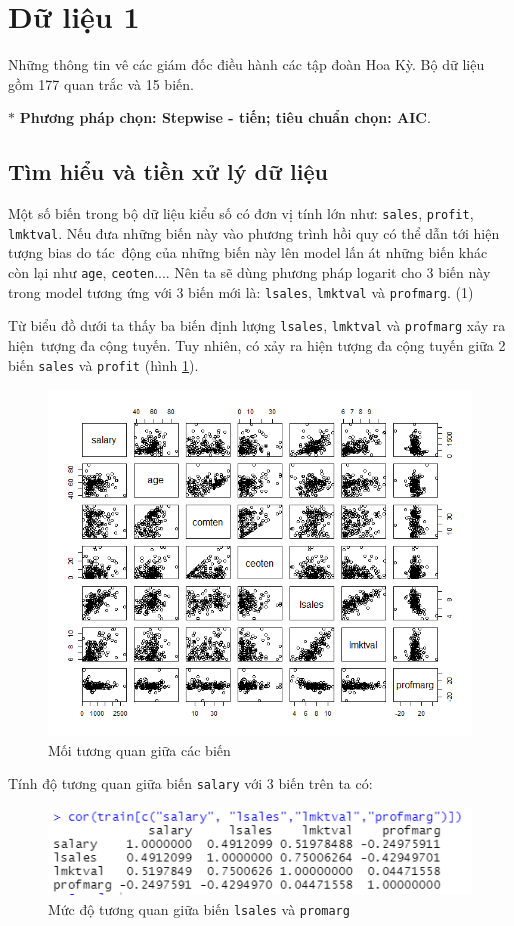 \section{Dữ liệu 1}
Những thông tin vê các giám đốc điều hành các tập đoàn Hoa Kỳ. Bộ dữ liệu gồm 177 quan trắc và 15 biến.

$*$ \textbf{Phương pháp chọn: Stepwise - tiến; tiêu chuẩn chọn: AIC}.

\subsection*{Tìm hiểu và tiền xử lý dữ liệu}

Một số biến trong bộ dữ liệu kiểu số có đơn vị tính lớn như: \texttt{sales}, \texttt{profit}, \texttt{lmktval}. Nếu đưa những biến này vào phương trình hồi quy có thể dẫn tới hiện tượng bias do tác~động của những biến này lên model lấn át những biến khác còn lại như \texttt{age}, \texttt{ceoten}.... Nên ta sẽ dùng phương pháp logarit cho 3 biến này trong model tương ứng với 3 biến mới là:  \texttt{lsales}, \texttt{lmktval} và \texttt{profmarg}. (1)

Từ biểu đồ dưới ta thấy ba biến định lượng \texttt{lsales}, \texttt{lmktval} và \texttt{profmarg} xảy ra hiện~tượng đa cộng tuyến. Tuy nhiên, có xảy ra hiện tượng đa cộng tuyến giữa 2 biến \texttt{sales} và \texttt{profit} (hình \ref{fig-b1:plot-vars}).

\begin{figure}[H]
	\centering
	\includegraphics[width=.75\linewidth]{../Photo Of Result/B1_plotVriables.png}  
	\caption{Mối tương quan giữa các biến}
	\label{fig-b1:plot-vars}
\end{figure}
Tính độ tương quan giữa biến \texttt{salary} với 3 biến trên ta có:
\begin{figure}[H]
	\centering
	\includegraphics[width=.7\linewidth]{../Photo Of Result/B1_CorTable.PNG}  
	\caption{Mức độ tương quan giữa biến \texttt{lsales} và \texttt{promarg}}
	\label{fig-b1:corr-table}
\end{figure}

